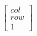 \documentclass[preview]{standalone}
\begin{document}
\begin{align*}
\begin{bmatrix} col \\ row \\ 1 \end{bmatrix}
\end{align*}
\end{document}
